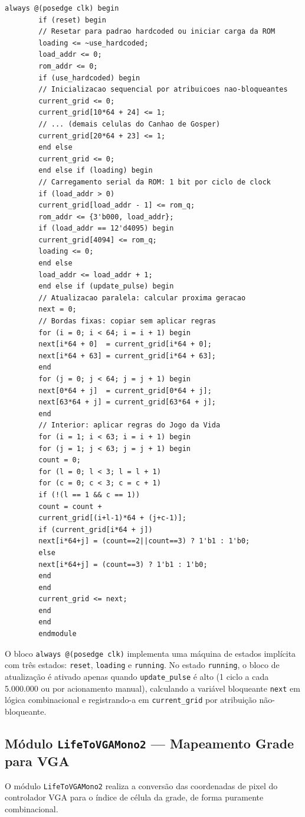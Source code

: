 \documentclass[12pt, a4paper]{article}
\begin{document}
\begin{lstlisting}[style=verilog, caption={\texttt{GameOfLife2.v} --- Núcleo do autômato celular com suporte a reset, carregamento de ROM e atualização paralela da grade 64$\times$64.}, label={lst:gameoflife}]
		always @(posedge clk) begin
		if (reset) begin
		// Resetar para padrao hardcoded ou iniciar carga da ROM
		loading <= ~use_hardcoded;
		load_addr <= 0;
		rom_addr <= 0;
		if (use_hardcoded) begin
		// Inicializacao sequencial por atribuicoes nao-bloqueantes
		current_grid <= 0;
		current_grid[10*64 + 24] <= 1;
		// ... (demais celulas do Canhao de Gosper)
		current_grid[20*64 + 23] <= 1;
		end else
		current_grid <= 0;
		end else if (loading) begin
		// Carregamento serial da ROM: 1 bit por ciclo de clock
		if (load_addr > 0)
		current_grid[load_addr - 1] <= rom_q;
		rom_addr <= {3'b000, load_addr};
		if (load_addr == 12'd4095) begin
		current_grid[4094] <= rom_q;
		loading <= 0;
		end else
		load_addr <= load_addr + 1;
		end else if (update_pulse) begin
		// Atualizacao paralela: calcular proxima geracao
		next = 0;
		// Bordas fixas: copiar sem aplicar regras
		for (i = 0; i < 64; i = i + 1) begin
		next[i*64 + 0]  = current_grid[i*64 + 0];
		next[i*64 + 63] = current_grid[i*64 + 63];
		end
		for (j = 0; j < 64; j = j + 1) begin
		next[0*64 + j]  = current_grid[0*64 + j];
		next[63*64 + j] = current_grid[63*64 + j];
		end
		// Interior: aplicar regras do Jogo da Vida
		for (i = 1; i < 63; i = i + 1) begin
		for (j = 1; j < 63; j = j + 1) begin
		count = 0;
		for (l = 0; l < 3; l = l + 1)
		for (c = 0; c < 3; c = c + 1)
		if (!(l == 1 && c == 1))
		count = count +
		current_grid[(i+l-1)*64 + (j+c-1)];
		if (current_grid[i*64 + j])
		next[i*64+j] = (count==2||count==3) ? 1'b1 : 1'b0;
		else
		next[i*64+j] = (count==3) ? 1'b1 : 1'b0;
		end
		end
		current_grid <= next;
		end
		end
		endmodule
	\end{lstlisting}
	
	O bloco \texttt{always @(posedge clk)} implementa uma máquina de estados implícita
	com três estados: \texttt{reset}, \texttt{loading} e \texttt{running}. No estado
	\texttt{running}, o bloco de atualização é ativado apenas quando \texttt{update\_pulse}
	é alto (1 ciclo a cada 5.000.000 ou por acionamento manual), calculando a variável
	bloqueante \texttt{next} em lógica combinacional e registrando-a em
	\texttt{current\_grid} por atribuição não-bloqueante.
	
	\subsection{Módulo \texttt{LifeToVGAMono2} --- Mapeamento Grade para VGA}
	
	O módulo \texttt{LifeToVGAMono2} realiza a conversão das coordenadas de pixel
	do controlador VGA para o índice de célula da grade, de forma puramente
	combinacional.
	
\end{document}
